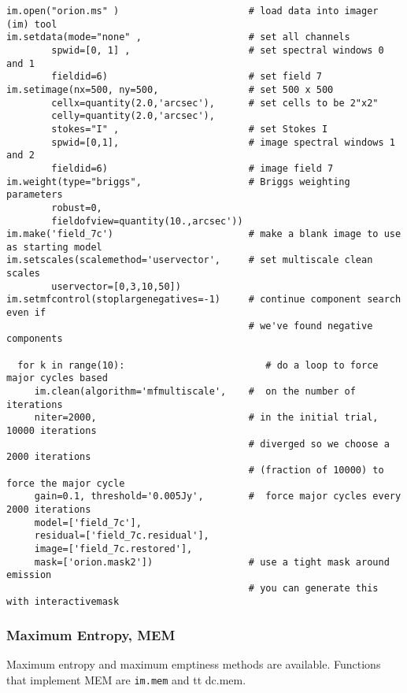 \small
\begin{verbatim}
im.open("orion.ms" )                       # load data into imager (im) tool
im.setdata(mode="none" ,                   # set all channels
        spwid=[0, 1] ,                     # set spectral windows 0 and 1
        fieldid=6)                         # set field 7
im.setimage(nx=500, ny=500,                # set 500 x 500
        cellx=quantity(2.0,'arcsec'),      # set cells to be 2"x2"
        celly=quantity(2.0,'arcsec'),
        stokes="I" ,                       # set Stokes I
        spwid=[0,1],                       # image spectral windows 1 and 2
        fieldid=6)                         # image field 7
im.weight(type="briggs",                   # Briggs weighting parameters
        robust=0,
        fieldofview=quantity(10.,arcsec'))
im.make('field_7c')                        # make a blank image to use as starting model
im.setscales(scalemethod='uservector',     # set multiscale clean scales
        uservector=[0,3,10,50])
im.setmfcontrol(stoplargenegatives=-1)     # continue component search even if
                                           # we've found negative components

  for k in range(10):                         # do a loop to force major cycles based
     im.clean(algorithm='mfmultiscale',    #  on the number of iterations
     niter=2000,                           # in the initial trial, 10000 iterations
                                           # diverged so we choose a 2000 iterations
                                           # (fraction of 10000) to force the major cycle
     gain=0.1, threshold='0.005Jy',        #  force major cycles every 2000 iterations
     model=['field_7c'],
     residual=['field_7c.residual'],
     image=['field_7c.restored'],
     mask=['orion.mask2'])                 # use a tight mask around emission
                                           # you can generate this with interactivemask
\end{verbatim}
\normalsize

\subsubsection{Maximum Entropy, MEM}
\label{subsubsection:synth.im.mem}

Maximum entropy and maximum emptiness methods are available. Functions
that implement MEM are {\tt im.mem} and {tt dc.mem}. 

